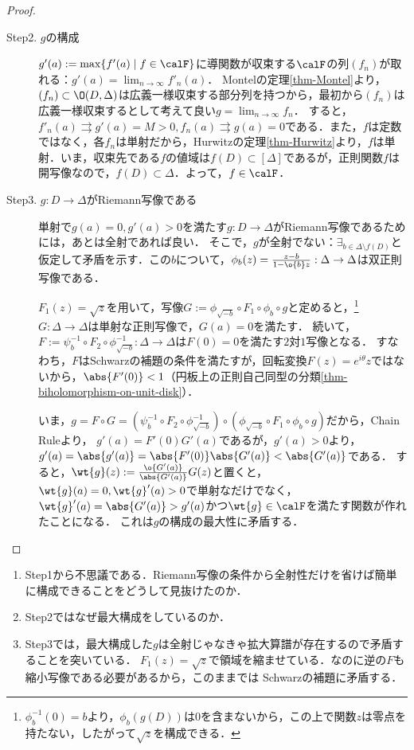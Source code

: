 \documentclass[uplatex, dvipdfmx]{jsreport}
\begin{document}
\begin{proof}
\begin{description}
\begin{enumerate}
        \end{enumerate}
        \item[Step2. $g$の構成] $g'(a):=\max\{f'(a)\mid f\in\calF\}$に導関数が収束する$\calF$の列$(f_n)$が取れる：$g'(a)=\lim_{n\to\infty}f'_n(a)$．
        Montelの定理\ref{thm-Montel}より，$(f_n)\subset\O(D,\Delta)$は広義一様収束する部分列を持つから，最初から$(f_n)$は広義一様収束するとして考えて良い$g=\lim_{n\to\infty}f_n$．
        すると，$f'_n(a)\rightrightarrows g'(a)=M>0,f_n(a)\rightrightarrows g(a)=0$である．また，$f$は定数ではなく，各$f_n$は単射だから，Hurwitzの定理\ref{thm-Hurwitz}より，$f$は単射．いま，収束先である$f$の値域は$f(D)\subset[\Delta]$であるが，正則関数$f$は開写像なので，$f(D)\subset\Delta$．よって，$f\in\calF$．
        \item[Step3. $g:D\to\Delta$がRiemann写像である] 単射で$g(a)=0,g'(a)>0$を満たす$g:D\to\Delta$がRiemann写像であるためには，あとは全射であれば良い．
        そこで，$g$が全射でない：$\exists_{b\in\Delta\setminus f(D)}$と仮定して矛盾を示す．この$b$について，$\phi_b(z)=\frac{z-b}{1-\o{b}z}:\Delta\to\Delta$は双正則写像である．

        $F_1(z)=\sqrt{z}$を用いて，写像$G:=\phi_{\sqrt{-b}}\circ F_1\circ\phi_b\circ g$と定めると，\footnote{$\phi_b^{-1}(0)=b$より，$\phi_b(g(D))$は$0$を含まないから，この上で関数$z$は零点を持たない，したがって$\sqrt{z}$を構成できる．}
        $G:\Delta\to\Delta$は単射な正則写像で，$G(a)=0$を満たす．
        続いて，$F:=\psi_b^{-1}\circ F_2\circ\phi^{-1}_{\sqrt{-b}}:\Delta\to\Delta$は$F(0)=0$を満たす$2$対$1$写像となる．
        すなわち，$F$はSchwarzの補題の条件を満たすが，回転変換$F(z)=e^{i\theta}z$ではないから，$\abs{F'(0)}<1$（円板上の正則自己同型の分類\ref{thm-biholomorphism-on-unit-disk}）．

        いま，$g=F\circ G=(\psi_b^{-1}\circ F_2\circ\phi^{-1}_{\sqrt{-b}})\circ(\phi_{\sqrt{-b}}\circ F_1\circ\phi_b\circ g)$だから，Chain Ruleより，
        $g'(a)=F'(0)G'(a)$であるが，$g'(a)>0$より，$g'(a)=\abs{g'(a)}=\abs{F'(0)}\abs{G'(a)}<\abs{G'(a)}$である．
        すると，$\wt{g}(z):=\frac{\o{G'(a)}}{\abs{G'(a)}}G(z)$と置くと，$\wt{g}(a)=0,\wt{g}'(a)>0$で単射なだけでなく，$\wt{g}'(a)=\abs{G'(a)}>g'(a)$かつ$\wt{g}\in\calF$を満たす関数が作れたことになる．
        これは$g$の構成の最大性に矛盾する．
    \end{description}
\end{proof}
\begin{remarks}\mbox{}
    \begin{enumerate}
        \item Step1から不思議である．Riemann写像の条件から全射性だけを省けば簡単に構成できることをどうして見抜けたのか．
        \item Step2ではなぜ最大構成をしているのか．
        \item Step3では，最大構成した$g$は全射じゃなきゃ拡大算譜が存在するので矛盾することを突いている．
        $F_1(z)=\sqrt{z}$で領域を縮ませている．なのに逆の$F$も縮小写像である必要があるから，このままでは
        Schwarzの補題に矛盾する．
    \end{enumerate}
\end{remarks}
\end{document}
